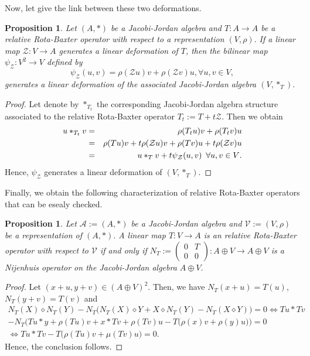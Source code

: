 \documentclass[12pt]{amsart}
\newtheorem{proposition}[Theorem]{Proposition}
\begin{document}
	Now, let give the link between these two deformations.
	\begin{proposition}
		Let $(A,\ast)$ be a Jacobi-Jordan algebra and $ T:A \rightarrow A$ be a relative Rota-Baxter operator with respect  to a representation $(V,\rho).$ If a linear map $\mathcal{Z}:V\rightarrow A$ generates a linear deformation of $T$, then the bilinear map 
		$\psi_{\mathcal{Z}} :V^{2}\rightarrow V $ defined by $$\psi_{\mathcal{Z}}(u,v)=\rho(\mathcal{Z}u)v+\rho(\mathcal{Z}v)u, \forall u,v \in V,$$ generates a  linear deformation of the associated Jacobi-Jordan algebra $(V,\ast_{T}).$ 
	\end{proposition}
	\begin{proof}
		Let denote by $\ast_{T_t}$ the corresponding Jacobi-Jordan algebra structure associated to the relative
		Rota-Baxter operator $T_t:=T + t\mathcal{Z}.$ Then we obtain
		\begin{eqnarray*}
			u\ast_{T_t} v&=&\rho(T_tu)v+\rho(T_tv)u\\
			&=&
			\rho(Tu)v+t\rho(\mathcal{Z}u)v+\rho(Tv)u+t\rho(\mathcal{Z}v)u\\
			&=&u\ast_T v+t\psi_{\mathcal{Z}}(u,v) 
			\mbox{\,\ $\forall u,v\in V$.}
		\end{eqnarray*}
		Hence, $\psi_{\mathcal{Z}}$ generates a linear deformation of $(V,\ast_{T}).$
	\end{proof}
	Finally, we obtain the following characterization of relative Rota-Baxter operators that can be esealy checked.
	\begin{proposition}
		Let $\mathcal{A}:=(A, \ast)$ be a Jacobi-Jordan algebra and $\mathcal{V}:=(V,\rho)$ be a representation of $(A, \ast).$
		A linear map $T: V\rightarrow A$ is an
		relative Rota-Baxter operator with respect  to
		$\mathcal{V}$ if and only if $N_T:=\left(
		\begin{array}{cc}
			0& T\\
			0& 0
		\end{array}
		\right)
		: A\oplus V \rightarrow A\oplus V$ is a Nijenhuis operator on
		the Jacobi-Jordan algebra $A\oplus V.$
	\end{proposition}
\begin{proof}
Let $ (x+u,y+v)\in (A\oplus V)^{2}$. Then, 
 we have
$N_{T}(x+u)=T(u)  $, $N_{T}(y+v)=T(v)  $ and
$ \begin{array}{lll}
N_{T}(X)\diamond N_{T}(Y)-N_{T}\bigg(N_{T}(X)\diamond Y+X \diamond N_{T}(Y)-N_{T}(X\diamond Y)\bigg)=0\iff
Tu\ast Tv\\
-N_{T}\bigg(Tu\ast y+\rho(Tu)v+x\ast Tv+\rho(Tv)u-T\bigg(\rho(x)v+\rho(y)u\bigg)\bigg)
=0\\
\iff Tu\ast Tv-T\bigg(\rho(Tu)v+\mu(Tv)u\bigg)=0. 
\end{array} $\\ Hence, the conclusion follows.
\end{proof}
\end{document}
